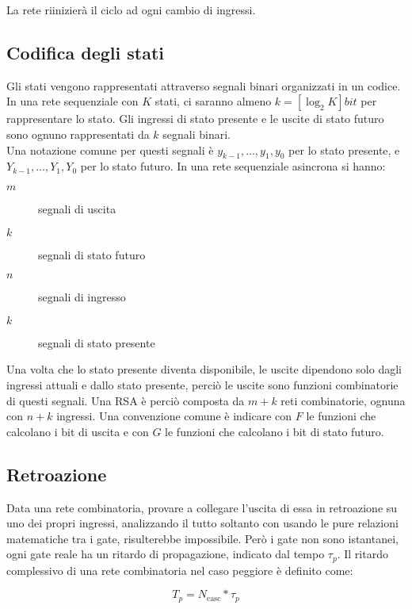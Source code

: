 \documentclass{article}
\begin{document}
\noindent
La rete riinizierà il ciclo ad ogni cambio di ingressi.

\subsection{Codifica degli stati}

Gli stati vengono rappresentati attraverso segnali binari organizzati in un codice.
In una rete sequenziale con $K$ stati, ci saranno almeno $k = [\log_2 K] bit$ per rappresentare lo stato.
Gli ingressi di stato presente e le uscite di stato futuro sono ognuno rappresentati da $k$ segnali binari.\\

\noindent
Una notazione comune per questi segnali è $y_{k-1}, \dots, y_1, y_0$ per lo stato presente, e $Y_{k-1}, \dots, Y_1, Y_0$ per lo stato futuro.
In una rete sequenziale asincrona si hanno:

\begin{description}
    \item[$m$] segnali di uscita
    \item[$k$] segnali di stato futuro
    \item[$n$] segnali di ingresso
    \item[$k$] segnali di stato presente
\end{description}

\noindent
Una volta che lo stato presente diventa disponibile, le uscite dipendono solo dagli ingressi attuali e dallo stato presente, perciò le uscite sono funzioni combinatorie di questi segnali.
Una RSA è perciò composta da $m+k$ reti combinatorie, ognuna con $n+k$ ingressi.
Una convenzione comune è indicare con $F$ le funzioni che calcolano i bit di uscita e con $G$ le funzioni che calcolano i bit di stato futuro.

\subsection{Retroazione}

Data una rete combinatoria, provare a collegare l'uscita di essa in retroazione su uno dei propri ingressi, analizzando il tutto soltanto con usando le pure relazioni matematiche tra i gate, risulterebbe impossibile.
Però i gate non sono istantanei, ogni gate reale ha un ritardo di propagazione, indicato dal tempo $\tau_p$.
Il ritardo complessivo di una rete combinatoria nel caso peggiore è definito come:

$$
T_p = N_{\text{casc}} * \tau_p
$$
\end{document}
